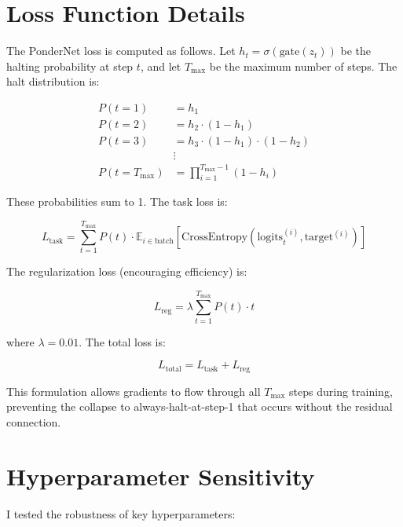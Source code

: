 \documentclass[11pt]{article}
\begin{document}
\section{Loss Function Details}

The PonderNet loss is computed as follows. Let $h_t = \sigma(\text{gate}(z_t))$ be the halting probability at step $t$, and let $T_{\max}$ be the maximum number of steps. The halt distribution is:

\begin{equation}
\begin{aligned}
P(t=1) &= h_1 \\
P(t=2) &= h_2 \cdot (1 - h_1) \\
P(t=3) &= h_3 \cdot (1 - h_1) \cdot (1 - h_2) \\
&\vdots \\
P(t=T_{\max}) &= \prod_{i=1}^{T_{\max}-1} (1 - h_i)
\end{aligned}
\end{equation}

These probabilities sum to 1. The task loss is:

\begin{equation}
L_{\text{task}} = \sum_{t=1}^{T_{\max}} P(t) \cdot \mathbb{E}_{i \in \text{batch}} [\text{CrossEntropy}(\text{logits}_t^{(i)}, \text{target}^{(i)})]
\end{equation}

The regularization loss (encouraging efficiency) is:

\begin{equation}
L_{\text{reg}} = \lambda \sum_{t=1}^{T_{\max}} P(t) \cdot t
\end{equation}

where $\lambda = 0.01$. The total loss is:

\begin{equation}
L_{\text{total}} = L_{\text{task}} + L_{\text{reg}}
\end{equation}

This formulation allows gradients to flow through all $T_{\max}$ steps during training, preventing the collapse to always-halt-at-step-1 that occurs without the residual connection.

\section{Hyperparameter Sensitivity}

I tested the robustness of key hyperparameters:
\end{document}
